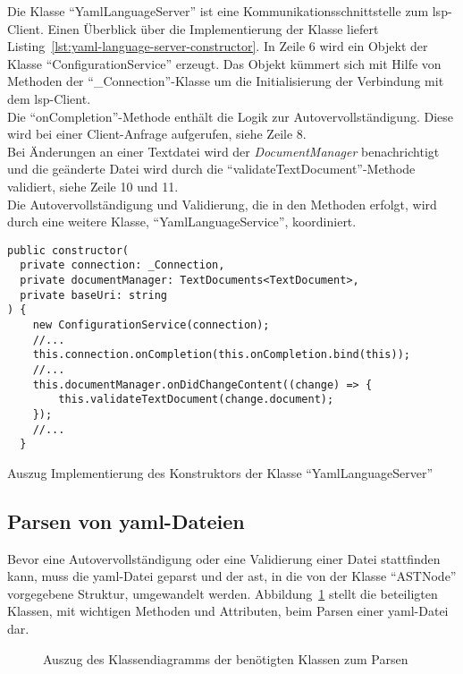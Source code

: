 Die Klasse ``YamlLanguageServer'' ist eine Kommunikationsschnittstelle zum \ac{lsp}-Client.
Einen Überblick über die Implementierung der Klasse liefert Listing~\ref{lst:yaml-language-server-constructor}.
In Zeile 6 wird ein Objekt der Klasse ``ConfigurationService'' erzeugt. Das Objekt kümmert sich
mit Hilfe von Methoden der ``\_Connection''-Klasse um die Initialisierung der Verbindung mit dem \ac{lsp}-Client.
\\
Die ``onCompletion''-Methode enthält die Logik zur Autovervollständigung. Diese wird bei einer Client-Anfrage
aufgerufen, siehe Zeile 8.
\\
Bei Änderungen an einer Textdatei wird der \textit{DocumentManager} benachrichtigt und die geänderte Datei
wird durch die ``validateTextDocument''-Methode validiert, siehe Zeile 10 und 11.
\\
Die Autovervollständigung und Validierung, die in den Methoden erfolgt, wird durch eine weitere Klasse, ``YamlLanguageService'', koordiniert.

\begin{listing}[htp]
  \begin{verbatim}
public constructor(
  private connection: _Connection,
  private documentManager: TextDocuments<TextDocument>,
  private baseUri: string
) {
    new ConfigurationService(connection);
    //...
    this.connection.onCompletion(this.onCompletion.bind(this));
    //...
    this.documentManager.onDidChangeContent((change) => {
        this.validateTextDocument(change.document);
    });
    //...
  }
      \end{verbatim}
  \caption{Auszug Implementierung des Konstruktors der Klasse ``YamlLanguageServer''}
  \label{lst:yaml-language-server-constructor}
\end{listing}

\subsection{Parsen von \acs{yaml}-Dateien}

Bevor eine Autovervollständigung oder eine Validierung einer Datei stattfinden kann, muss die \ac{yaml}-Datei geparst und
der \ac{ast}, in die von der Klasse ``ASTNode'' vorgegebene Struktur, umgewandelt werden.
Abbildung~\ref{fig:class-diagram-yaml-language-service-parser} stellt die beteiligten Klassen, mit wichtigen Methoden und Attributen,
beim Parsen einer \ac{yaml}-Datei dar.

\begin{figure}[htp] %
  \centering
  \caption{Auszug des Klassendiagramms der benötigten Klassen zum Parsen}
  \label{fig:class-diagram-yaml-language-service-parser}
\end{figure}

